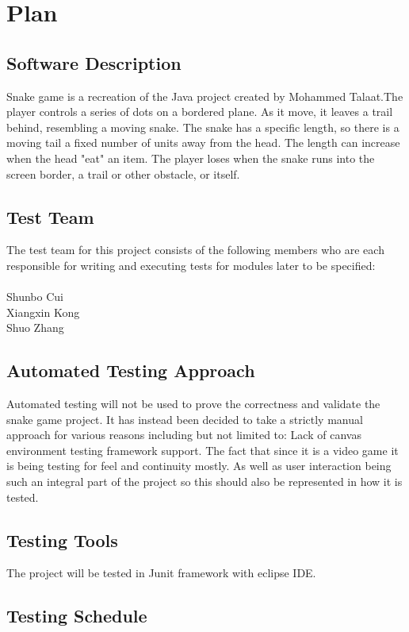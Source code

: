 \documentclass[12pt, titlepage]{article}
\begin{document}
\section{Plan}                  %
	
\subsection{Software Description}
Snake game is a recreation of the Java project created by Mohammed Talaat.The player controls a series of dots on a bordered plane. As it move, it leaves a trail behind, resembling a moving snake. The snake has a specific length, so there is a moving tail a fixed number of units away from the head. The length can increase when the head "eat" an item. The player loses when the snake runs into the screen border, a trail or other obstacle, or itself.


\subsection{Test Team}
The test team for this project consists of the following members who are each responsible for writing and executing tests for modules later to be specified:\\
    \\Shunbo Cui
		\\Xiangxin Kong
		\\Shuo Zhang	


\subsection{Automated Testing Approach}
Automated testing will not be used to prove the correctness and validate the snake game project. It has instead been decided to take a strictly manual approach for various reasons including but not limited to: Lack of canvas environment testing framework support. The fact that since it is a video game it is being testing for feel and continuity mostly. As well as user interaction being such an integral part of the project so this should also be represented in how it is tested.


\subsection{Testing Tools}
The project will be tested in Junit framework with eclipse IDE.



\subsection{Testing Schedule}
		
\end{document}
